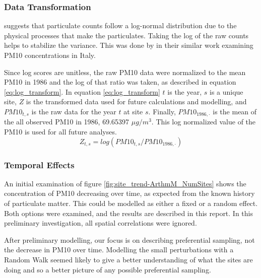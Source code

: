 \documentclass{article}
\begin{document}
\subsubsection*{Data Transformation}
\label{subsubsec:datatrans}
\cite{ott1990} suggests that particulate counts follow a log-normal distribution due to the physical processes that make the particulates.  Taking the log of the raw counts helps to stabilize the variance.  This was done by \cite{cameletti2011spatio}  in their similar work examining PM10 concentrations in Italy.

Since log scores are unitless, the raw \ac{PM10} data were normalized to the mean \ac{PM10} in 1986 and the log of that ratio was taken, as described in equation \ref{eq:log_transform}.  In equation \ref{eq:log_transform} $t$ is the year, $s$ is a unique site, $Z$ is the transformed data used for future calculations and modelling, and $PM10_{t,s}$ is the raw data for the year $t$ at site $s$.  Finally, $PM10_{1986,\cdot}$ is the mean of the all observed \ac{PM10} in 1986, 69.65397 $\mu g/m^3$.  This log normalized value of the \ac{PM10} is used for all future analyses.
\begin{equation}
	Z_{t,s} = log(PM10_{t,s}/ PM10_{1986,\cdot})
\end{equation} \label{eq:log_transform}


\subsubsection*{Temporal Effects}
\label{subsubsec:tempeffects}
An initial examination of figure \ref{fig:site_trend-ArthmM_NumSites} shows the concentration of \ac{PM10} decreasing over time, as expected from the known history of particulate matter.  This could be modelled as either a fixed or a random effect.  Both options were examined, and the results are described in this report.  In this preliminary investigation, all spatial correlations
were ignored.

After preliminary modelling, our focus is on describing preferential sampling, not the decrease in \ac{PM10} over time. Modelling the small perturbations with a Random Walk seemed likely to give a better understanding of what the sites are doing and so a better picture of any possible preferential sampling.  
\end{document}
